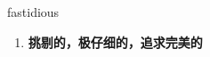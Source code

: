 
\begin{frame}
{\huge fastidious}
\begin{center}
\begin{enumerate}\Large
  \item \textbf{挑剔的，极仔细的，追求完美的}
\end{enumerate}
\end{center}
\end{frame}

